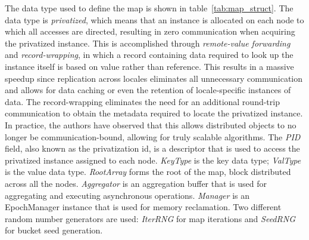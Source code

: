\documentclass[letterpaper, 10 pt, conference]{ieeeconf}  %
\begin{document}
The data type used to define the map is shown in table~\ref{tab:map_struct}. The data type is \textit{privatized}, which means that an instance is allocated on each node to which all accesses are directed, resulting in zero communication when acquiring the privatized instance. This is accomplished through \textit{remote-value forwarding} and \textit{record-wrapping}, in which a record containing data required to look up the instance itself is based on value rather than reference. This results in a massive speedup since replication across locales eliminates all unnecessary communication and allows for data caching or even the retention of locale-specific instances of data. The record-wrapping eliminates the need for an additional round-trip communication to obtain the metadata required to locate the privatized instance. In practice, the authors have observed that this allows distributed objects to no longer be communication-bound, allowing for truly scalable algorithms. The \textit{PID} field, also known as the privatization id, is a descriptor that is used to access the privatized instance assigned to each node. \textit{KeyType} is the key data type; \textit{ValType} is the value data type. \textit{RootArray} forms the root of the map, block distributed across all the nodes. \textit{Aggregator} is an aggregation buffer that is used for aggregating and executing asynchronous operations. \textit{Manager} is an EpochManager instance that is used for memory reclamation. Two different random number generators are used: \textit{IterRNG} for map iterations and \textit{SeedRNG} for bucket seed generation.
\end{document}
